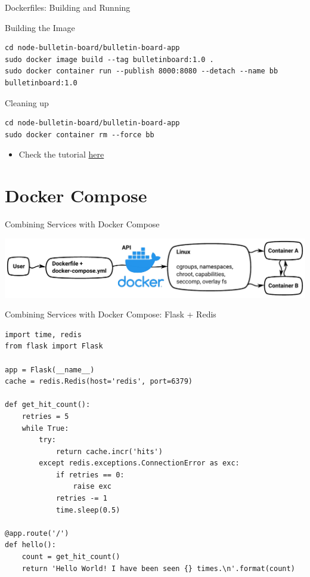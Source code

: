 \documentclass[10pt, compress, aspectratio=169, xcolor={table,usenames,dvipsnames}]{beamer}
\begin{document}
\begin{frame}[label={sec:org3c8f4b9},fragile]{Dockerfiles: Building and Running}
 \begin{block}{Building the Image}
\lstset{language=bash,label= ,caption= ,captionpos=b,numbers=none}
\begin{lstlisting}
cd node-bulletin-board/bulletin-board-app
sudo docker image build --tag bulletinboard:1.0 .
sudo docker container run --publish 8000:8080 --detach --name bb bulletinboard:1.0
\end{lstlisting}
\end{block}

\begin{block}{Cleaning up}
\lstset{language=bash,label= ,caption= ,captionpos=b,numbers=none}
\begin{lstlisting}
cd node-bulletin-board/bulletin-board-app
sudo docker container rm --force bb
\end{lstlisting}

\begin{itemize}
\item Check the \alert{tutorial} \href{https://docs.docker.com/get-started/part2/}{here}
\end{itemize}
\end{block}
\end{frame}
\section{Docker Compose}
\label{sec:org708e199}
\begin{frame}[label={sec:orgd49ab4a}]{Combining Services with Docker Compose}
\begin{center}
\includegraphics[width=.82\columnwidth]{../../img/virt_with_docker_compose.pdf}
\end{center}
\end{frame}
\begin{frame}[label={sec:org21a3462},fragile]{Combining Services with Docker Compose: Flask + Redis}
 \lstset{language=Python,label= ,caption= ,captionpos=b,numbers=none}
\begin{lstlisting}
import time, redis
from flask import Flask

app = Flask(__name__)
cache = redis.Redis(host='redis', port=6379)

def get_hit_count():
    retries = 5
    while True:
        try:
            return cache.incr('hits')
        except redis.exceptions.ConnectionError as exc:
            if retries == 0:
                raise exc
            retries -= 1
            time.sleep(0.5)

@app.route('/')
def hello():
    count = get_hit_count()
    return 'Hello World! I have been seen {} times.\n'.format(count)
\end{lstlisting}
\end{frame}
\end{document}
